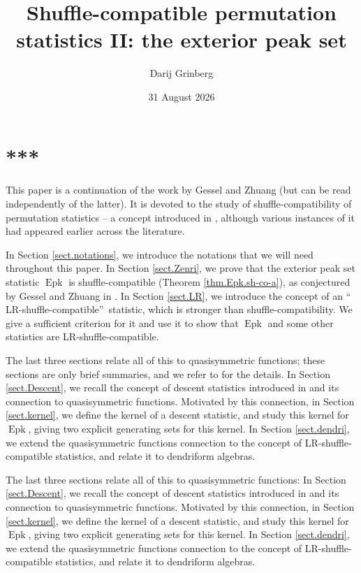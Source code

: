 \documentclass[numbers=enddot,12pt,final,onecolumn,notitlepage]{scrartcl}%
\theoremstyle{definition}
\newenvironment{verlong}{}{}
\newenvironment{vershort}{}{}
\begin{document}
\title{Shuffle-compatible permutation statistics II: the exterior peak set}
\author{Darij Grinberg}
\date{31 August 2026}
\maketitle
\tableofcontents

\section*{***}

This paper is a continuation of the work \cite{part1} by Gessel and Zhuang
(but can be read independently of the latter). It is devoted to the study of
shuffle-compatibility of permutation statistics -- a concept introduced in
\cite{part1}, although various instances of it had appeared earlier across
the literature.

In Section \ref{sect.notations}, we introduce the notations that we will need
throughout this paper. In Section \ref{sect.Zenri}, we prove that the exterior
peak set statistic $\operatorname{Epk}$ is shuffle-compatible (Theorem
\ref{thm.Epk.sh-co-a}), as conjectured by Gessel and Zhuang in \cite{part1}.
In Section \ref{sect.LR}, we introduce the concept of an \textquotedblleft
LR-shuffle-compatible\textquotedblright\ statistic, which is stronger than
shuffle-compatibility. We give a sufficient criterion for it and use it to
show that $\operatorname{Epk}$ and some other statistics are
LR-shuffle-compatible.

\begin{vershort}
The last three sections relate all of this to quasisymmetric functions; these
sections are only brief summaries, and we refer to \cite{verlong} for the
details. In Section \ref{sect.Descent}, we recall the concept of descent
statistics introduced in \cite{part1} and its connection to quasisymmetric
functions. Motivated by this connection, in Section \ref{sect.kernel}, we
define the kernel of a descent statistic, and study this kernel for
$\operatorname{Epk}$, giving two explicit generating sets for this kernel. In
Section \ref{sect.dendri}, we extend the quasisymmetric functions connection
to the concept of LR-shuffle-compatible statistics, and relate it to
dendriform algebras.
\end{vershort}

\begin{verlong}
The last three sections relate all of this to quasisymmetric functions: In
Section \ref{sect.Descent}, we recall the concept of descent statistics
introduced in \cite{part1} and its connection to quasisymmetric functions.
Motivated by this connection, in Section \ref{sect.kernel}, we define the
kernel of a descent statistic, and study this kernel for
$\operatorname{Epk}$, giving two explicit generating sets for this kernel.
In Section \ref{sect.dendri},
we extend the quasisymmetric functions connection to the
concept of LR-shuffle-compatible statistics, and relate it to dendriform algebras.
\end{verlong}
\end{document}
